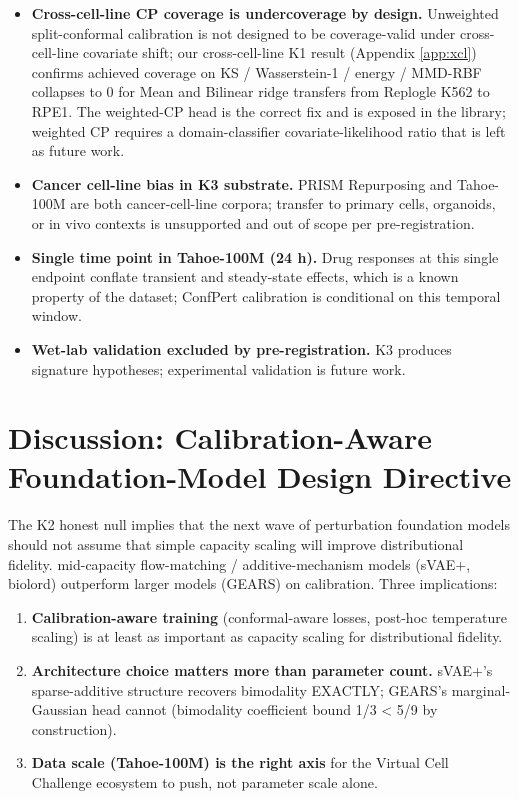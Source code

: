 \documentclass{article}
\begin{document}
\begin{itemize}
\item \textbf{Cross-cell-line CP coverage is undercoverage by design.} Unweighted split-conformal calibration is not designed to be coverage-valid under cross-cell-line covariate shift; our cross-cell-line K1 result (Appendix \ref{app:xcl}) confirms achieved coverage on KS / Wasserstein-1 / energy / MMD-RBF collapses to 0 for Mean and Bilinear ridge transfers from Replogle K562 to RPE1. The \citet{tibshirani2019} weighted-CP head is the correct fix and is exposed in the library; weighted CP requires a domain-classifier covariate-likelihood ratio that is left as future work.
\item \textbf{Cancer cell-line bias in K3 substrate.} PRISM Repurposing and Tahoe-100M are both cancer-cell-line corpora; transfer to primary cells, organoids, or in vivo contexts is unsupported and out of scope per pre-registration.
\item \textbf{Single time point in Tahoe-100M (24 h).} Drug responses at this single endpoint conflate transient and steady-state effects, which is a known property of the dataset; ConfPert calibration is conditional on this temporal window.
\item \textbf{Wet-lab validation excluded by pre-registration.} K3 produces signature hypotheses; experimental validation is future work.
\end{itemize}

\section{Discussion: Calibration-Aware Foundation-Model Design Directive}

The K2 honest null implies that the next wave of perturbation foundation models should not assume that simple capacity scaling will improve distributional fidelity. mid-capacity flow-matching / additive-mechanism models (sVAE+, biolord) outperform larger models (GEARS) on calibration. Three implications:

\begin{enumerate}
\item \textbf{Calibration-aware training} (conformal-aware losses, post-hoc temperature scaling) is at least as important as capacity scaling for distributional fidelity.
\item \textbf{Architecture choice matters more than parameter count.} sVAE+'s sparse-additive structure recovers bimodality EXACTLY; GEARS's marginal-Gaussian head cannot (bimodality coefficient bound 1/3 < 5/9 by construction).
\item \textbf{Data scale (Tahoe-100M) is the right axis} for the Virtual Cell Challenge ecosystem to push, not parameter scale alone.
\end{enumerate}
\end{document}
